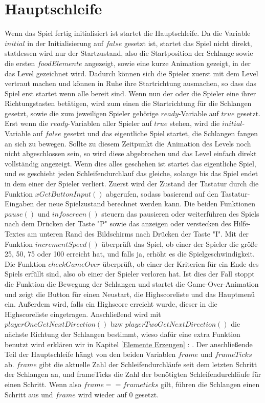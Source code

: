 \section{Hauptschleife}
\label{Hauptschleife}
%
Wenn das Spiel fertig initialisiert ist startet die Hauptschleife. Da die Variable $initial$ in der Initialisierung auf $false$ gesetzt ist, startet das Spiel nicht direkt, statdessen wird nur der Startzustand, also die Startposition der Schlange sowie die ersten $foodElemente$ angezeigt, sowie eine kurze Animation gezeigt, in der das Level gezeichnet wird. Dadurch können sich die Spieler zuerst mit dem Level vertraut machen und können in Ruhe ihre Startrichtung ausmachen, so dass das Spiel erst startet wenn alle bereit sind. Wenn nun der oder die Spieler eine ihrer Richtungstasten betätigen, wird zum einen die Startrichtung für die Schlangen gesetzt, sowie die zum jeweiligen Spieler gehörige $ready$-Variable auf $true$ gesetzt. Erst wenn die $ready$-Variablen aller Spieler auf $true$ stehen, wird die $initial$-Variable auf $false$ gesetzt und das eigentliche Spiel startet, die Schlangen fangen an sich zu bewegen. Sollte zu diesem Zeitpunkt die Animation des Levels noch nicht abgeschlossen sein, so wird diese abgebrochen und das Level einfach direkt vollständig angezeigt.
Wenn dies alles geschehen ist startet das eigentliche Spiel, und es geschieht jeden Schleifendurchlauf das gleiche, solange bis das Spiel endet in dem einer der Spieler verliert.
Zuerst wird der Zustand der Tastatur durch die Funktion $xGetButtonInput()$ abgerufen, sodass basierend auf den Tastatur-Eingaben der neue Spielzustand berechnet werden kann. Die beiden Funktionen $pause()$ und $infoscreen()$ steuern das pausieren oder weiterführen des Spiels nach dem Drücken der Taste "P" sowie das anzeigen oder verstecken des Hilfe-Textes am unteren Rand des Bildschirms nach Drücken der Taste "I". Mit der Funktion $incrementSpeed()$ überprüft das Spiel, ob einer der Spieler die größe 25, 50, 75 oder 100 erreicht hat, und falls ja, erhöht es die Spielgeschwindigkeit. Die Funktion $checkGameOver$ überprüft, ob einer der Kriterien für ein Ende des Spiels erfüllt sind, also ob einer der Spieler verloren hat. Ist dies der Fall stoppt die Funktion die Bewegung der Schlangen und startet die Game-Over-Animation und zeigt die Button für einen Neustart, die Highscoreliste und das Hauptmenü ein. Außerdem wird, falls ein Highscore erreicht wurde, dieser in die Highscoreliste eingetragen.
Anschließend wird mit $playerOneGetNextDirection()$ bzw $playerTwoGetNextDirection()$ die nächste Richtung der Schlangen bestimmt, wieso dafür eine extra Funktion benutzt wird erklären wir in Kapitel \ref{Elemente Erzeugen}  : .
Der anschließende Teil der Hauptschleife hängt von den beiden Variablen $frame$ und $frameTicks$ ab. $frame$ gibt die aktuelle Zahl der Schleifendurchläufe seit dem letzten Schritt der Schlangen an, und frameTicks die Zahl der benötigten Schleifendurchläufe für einen Schritt. Wenn also $frame == frameticks$ gilt, führen die Schlangen einen Schritt aus und $frame$ wird wieder auf 0 gesetzt.

%


   

%
